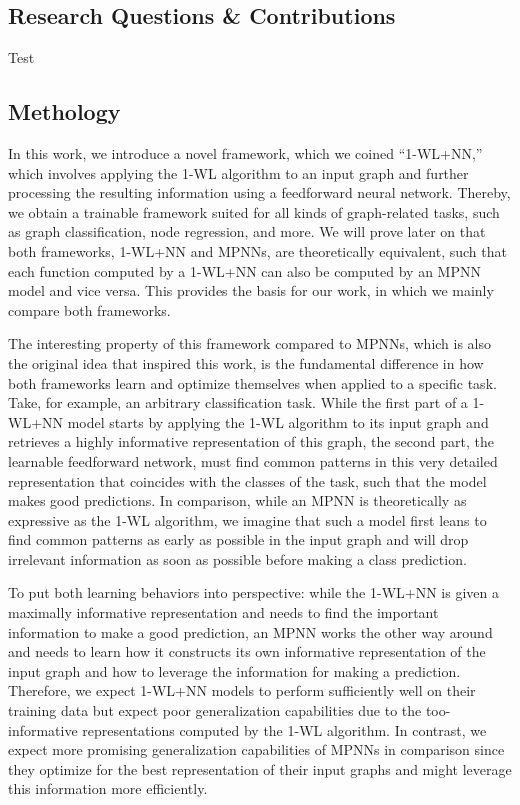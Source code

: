 \subsection{Research Questions \& Contributions}
Test

\subsection{Methology}
In this work, we introduce a novel framework, which we coined ``1-WL+NN,'' which involves applying the 1-WL algorithm to an input graph and further processing the resulting information using a feedforward neural network. Thereby, we obtain a trainable framework suited for all kinds of graph-related tasks, such as graph classification, node regression, and more. We will prove later on that both frameworks, 1-WL+NN and MPNNs, are theoretically equivalent, such that each function computed by a 1-WL+NN can also be computed by an MPNN model and vice versa. This provides the basis for our work, in which we mainly compare both frameworks.

The interesting property of this framework compared to MPNNs, which is also the original idea that inspired this work, is the fundamental difference in how both frameworks learn and optimize themselves when applied to a specific task. Take, for example, an arbitrary classification task. While the first part of a 1-WL+NN model starts by applying the 1-WL algorithm to its input graph and retrieves a highly informative representation of this graph, the second part, the learnable feedforward network, must find common patterns in this very detailed representation that coincides with the classes of the task, such that the model makes good predictions. In comparison, while an MPNN is theoretically as expressive as the 1-WL algorithm, we imagine that such a model first leans to find common patterns as early as possible in the input graph and will drop irrelevant information as soon as possible before making a class prediction. 

To put both learning behaviors into perspective: while the 1-WL+NN is given a maximally informative representation and needs to find the important information to make a good prediction, an MPNN works the other way around and needs to learn how it constructs its own informative representation of the input graph and how to leverage the information for making a prediction. Therefore, we expect 1-WL+NN models to perform sufficiently well on their training data but expect poor generalization capabilities due to the too-informative representations computed by the 1-WL algorithm. In contrast, we expect more promising generalization capabilities of MPNNs in comparison since they optimize for the best representation of their input graphs and might leverage this information more efficiently. 

